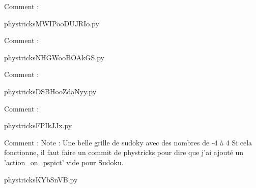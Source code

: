     Comment : 

    \clearpage
    


    \newcommand{\CaptionFigMWIPooDUJRIo}{<+Type your caption here+>}
    \begin{center}
        
    \end{center}
    phystricksMWIPooDUJRIo.py

    Comment : 

    \clearpage
    


    \newcommand{\CaptionFigNHGWooBOAkGS}{<+Type your caption here+>}
    \begin{center}
        
    \end{center}
    phystricksNHGWooBOAkGS.py

    Comment : 

    \clearpage
    


    \newcommand{\CaptionFigDSBHooZdaNyy}{<+Type your caption here+>}
    \begin{center}
        
    \end{center}
    phystricksDSBHooZdaNyy.py

    Comment : 

    \clearpage
    


    \newcommand{\CaptionFigFPIkJJx}{<+Type your caption here+>}
    \begin{center}
        
    \end{center}
    phystricksFPIkJJx.py

    Comment : Note : Une belle grille de sudoky avec des nombres de -4 à 4 Si cela fonctionne, il faut faire un commit de phystricks pour dire que j'ai ajouté un 'action\_on\_pspict' vide pour Sudoku.

    \clearpage
    


    \newcommand{\CaptionFigKYbSnVB}{<+Type your caption here+>}
    \begin{center}
        
    \end{center}
    phystricksKYbSnVB.py

